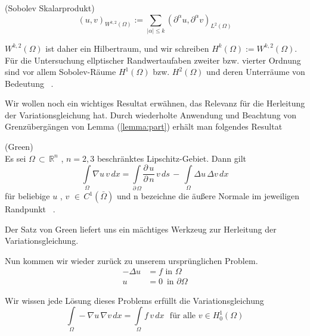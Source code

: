 \begin{Definition} (Sobolev Skalarprodukt) \\
\begin{equation*}
(u,v)_{{W^{{k,2}}(\Omega )}}:=\sum _{{|\alpha |\leq k}}(\partial ^{\alpha }u,\partial ^{\alpha }v)_{{L^{2}(\Omega )}}
\end{equation*}
\end{Definition}

$W^{{k,2}}(\Omega )$ ist daher ein Hilbertraum, und wir schreiben $H^{k}(\Omega ):=W^{{k,2}}(\Omega )$.
Für die Untersuchung ellptischer Randwertaufaben zweiter bzw. vierter Ordnung sind vor allem Sobolev-Räume $H^1(\Omega)$ bzw. $H^2(\Omega)$ und deren Unterräume von Bedeutung ~\cite[134]{Numerik}. 

Wir wollen noch ein wichtiges Resultat erwähnen, das Relevanz für die Herleitung der Variationsgleichung hat.
Durch wiederholte Anwendung und Beachtung von Grenzübergängen von Lemma (\ref{lemma:part}) erhält man folgendes Resultat

\begin{Satz} (Green) \\
Es sei $\Omega \, \subset \, \mathbb{R}^{n}$ , $n=2,3$ beschränktes Lipschitz-Gebiet. Dann gilt
\begin{equation*}
\int\limits_{\Omega} \nabla u \, v \, dx = \int\limits_{\partial \, \Omega} \dfrac{\partial \, u}{\partial \, n} \, v \, ds \, - \,
\int\limits_{\Omega} \Delta u \, \Delta v \, dx
\end{equation*}
für beliebige $u$ , $v$ $\in \, C^1(\bar{\Omega})$ und n bezeichne die äußere Normale im jeweiligen Randpunkt ~\cite[140]{Numerik}.
\end{Satz}
Der Satz von Green liefert uns ein mächtiges Werkzeug zur Herleitung der Variationsgleichung.

Nun kommen wir wieder zurück zu unserem ursprünglichen Problem.
\begin{equation*} 
\begin{aligned}
	- \Delta u &= f \text{ in } \Omega \\
	u &= 0 \, \text{ in } \partial \Omega	
\end{aligned}
\end{equation*}

Wir wissen jede Lösung dieses Problems erfüllt die Variationsgleichung
\begin{equation}  \label{eq:vary}
\int\limits_{\Omega} - \nabla u \, \nabla v \, dx = \int\limits_{\Omega} f \, v \, dx \, \, \text{ für alle } v \in H^1_0(\Omega)
\end{equation}

